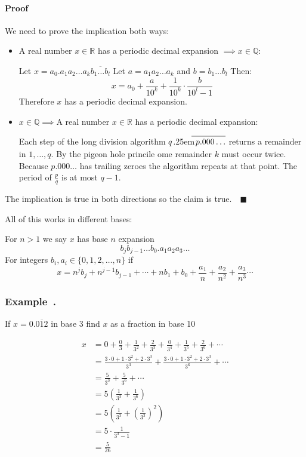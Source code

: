 \documentclass{article}
\newcommand{\bb}[1]{\mathbb{#1}}
\newcommand\mydiv[2]{%
$\strut#1$\kern.25em\smash{\raise.3ex\hbox{$\big)$}}$\mkern-8mu %
      \overline{\enspace\strut#2}$}
\newcounter{example}[section]
\newenvironment{example}[1][]{\refstepcounter{example}\vspace{-0.2cm}
\subsubsection*{Example~\thesection.\theexample} \rmfamily}{\par}
\begin{document}
\paragraph{Proof} We need to prove the implication both ways:
\begin{itemize}
\item A real number \(x\in\bb R\) has a periodic decimal expansion \(\implies x\in\bb Q\):

Let \(x=a_0.a_1a_2\dotso a_k\overline{b_1\dotso b_l}\)
Let \(a=a_1a_2\dotso a_k\) and \(b=b_1\dotso b_l\)
Then:
\[x=a_0+\frac{a}{10^k}+\frac{1}{10^k}\cdot\frac{b}{10^l-1}\]
Therefore \(x\) has a periodic decimal expansion.

\item \(x\in\bb Q\implies\)A real number \(x\in\bb R\) has a periodic decimal expansion:

Each step of the long division algorithm \mydiv{q}{p.000\dotso} returns a remainder in \(1,\dotsc,q\). By the pigeon hole princile ome remainder \(k\) must occur twice. Because \(p.000\dotso\) has trailing zeroes the algorithm repeats at that point. The period of \(\frac pq\) is at most \(q-1\).
\end{itemize}
The implication is true in both directions so the claim is true.\(\quad\blacksquare\)

All of this works in different bases:

For \(n>1\) we say \(x\) has base \(n\) expansion
\[b_jb_{j-1}\dotso b_0.a_1a_2a_3\dotso\]
For integers \(b_i,a_i\in\{0,1,2,\dotsc,n\}\) if
\[x=n^jb_j+n^{j-1}b_{j-1}+\dotsb+nb_1+b_0+\frac{a_1}{n}+\frac{a_2}{n^2}+\frac{a_3}{n^3}\dotsb\]

\begin{example}
If \(x=0.\overline{012}\) in base 3 find \(x\) as a fraction in base 10

\begin{align*}
x&=0+\frac{0}{3}+\frac{1}{3^2}+\frac{2}{3^3}+\frac{0}{3^4}+\frac{1}{3^5}+\frac{2}{3^6}+\dotsb\\
&=\frac{3\cdot0+1\cdot3^2+2\cdot3^3}{3^3}+\frac{3\cdot0+1\cdot3^2+2\cdot3^3}{3^6}+\dotsb\\
&=\frac{5}{3^3}+\frac{5}{3^6}+\dotsb\\
&=5\left(\frac{1}{3^3}+\frac{1}{3^6}\right)\\
&=5\left(\frac{1}{3^3}+\left(\frac{1}{3^3}\right)^2\right)\\
&=5\cdot\frac{1}{3^3-1}\\
&=\frac{5}{26}
\end{align*}
\end{example}
\end{document}
